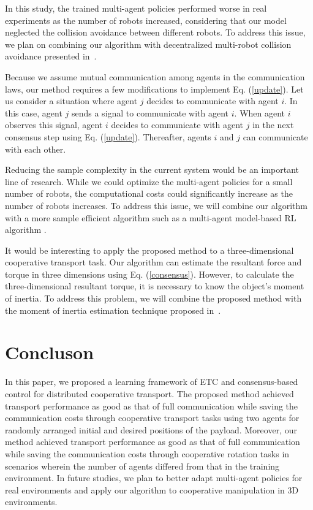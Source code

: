 \documentclass[letterpaper, 10 pt, conference]{ieeeconf} %
\begin{document}
In this study, the trained multi-agent policies performed worse in real experiments as the number of robots increased, considering that our model neglected the collision avoidance between different robots.
To address this issue, we plan on combining our algorithm with decentralized
multi-robot collision avoidance presented in~\cite{Zhai}.

Because we assume mutual communication among agents in the communication laws, our method requires a few modifications to implement Eq. (\ref{update}). Let us consider a situation where agent $j$ decides to communicate with agent $i$. In this case, agent $j$ sends a signal to communicate with agent $i$. When agent $i$ observes this signal, agent $i$ decides to communicate with agent $j$ in the next consensus step using Eq. (\ref{update}). Thereafter, agents $i$ and $j$ can communicate with each other.

Reducing the sample complexity in the current system would be an important line of research.
While we could optimize the multi-agent policies for a small number of robots, the computational costs could significantly increase as the number of robots increases.
To address this issue, we will combine our algorithm with a more sample efficient algorithm such as a multi-agent model-based RL algorithm \cite{Willemsen}.

It would be interesting to apply the proposed method to a three-dimensional cooperative transport task. Our algorithm can estimate the resultant force and torque in three dimensions using Eq. (\ref{consensus}). However, to calculate the three-dimensional resultant torque, it is necessary to know the object's moment of inertia. To address this problem, we will combine the proposed method with the moment of inertia estimation technique proposed in~\cite{Franchi2015}.

\section{Concluson}
In this paper, we proposed a learning framework of ETC and consensus-based control for distributed cooperative
transport.
The proposed method achieved transport performance as good as that of full communication while saving the communication costs through cooperative transport tasks using two agents for randomly arranged initial and desired positions of the payload.
Moreover, our method achieved transport performance as good as that of full communication while saving the communication costs through
cooperative rotation tasks in scenarios wherein the number of agents differed from that in the training environment.
In future studies, we plan to better adapt multi-agent policies for real environments and apply our algorithm to cooperative manipulation in 3D environments.
\end{document}
